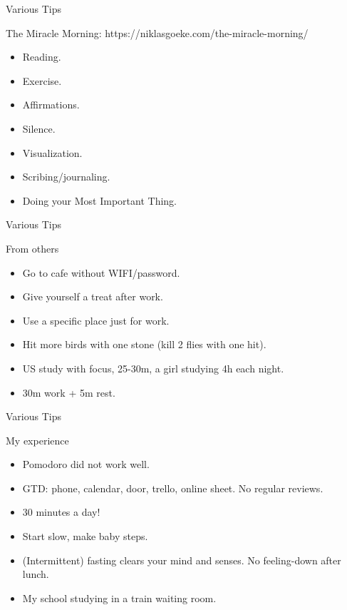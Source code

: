 \begin{frame}{Various Tips}
  \begin{block}{The Miracle Morning: https://niklasgoeke.com/the-miracle-morning/}
    \begin{itemize}
      \item Reading.
      \item Exercise.
      \item Affirmations.
      \item Silence.
      \item Visualization.
      \item Scribing/journaling.
      \item Doing your Most Important Thing.
    \end{itemize}
  \end{block}
\end{frame}

\begin{frame}{Various Tips}
  \begin{block}{From others}
    \begin{itemize}
      \item Go to cafe without WIFI/password.
      \item Give yourself a treat after work.
      \item Use a specific place just for work.
      \item Hit more birds with one stone (kill 2 flies with one hit).
      \item US study with focus, 25-30m, a girl studying 4h each night.
      \item 30m work + 5m rest.
    \end{itemize}
  \end{block}
\end{frame}

\begin{frame}{Various Tips}
  \begin{block}{My experience}
    \begin{itemize}
      \item Pomodoro did not work well. %
      \item GTD: phone, calendar, door, trello, online sheet. No regular reviews.
      \item 30 minutes a day!
      \item Start slow, make baby steps. %
      \item (Intermittent) fasting clears your mind and senses. No feeling-down after lunch.
      \item My school studying in a train waiting room.
    \end{itemize}
  \end{block}
\end{frame}

